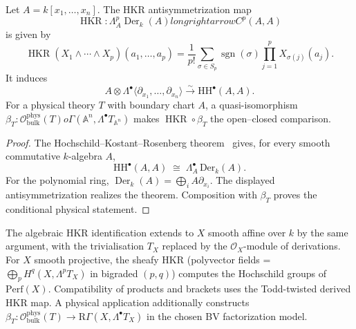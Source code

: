 \begin{proposition}
\label{prop:master-oca-bmodel}
Let $A=k[x_1,\ldots,x_n]$.  The HKR antisymmetrization map
\[
 \operatorname{HKR}\colon
 \Lambda_A^p\operatorname{Der}_k(A)longrightarrow C^p(A,A)
\]
is given by
\[
 \operatorname{HKR}(X_1\wedge\cdots\wedge X_p)
 (a_1,\ldots,a_p)
 =\frac1{p!}\sum_{\sigma\in S_p}\!\operatorname{sgn}(\sigma)
 \prod_{j=1}^pX_{\sigma(j)}(a_j).
\]
It induces
\[
 A\otimes\Lambda^\bullet
 \langle\partial_{x_1},\ldots,\partial_{x_n}\rangle
 \xrightarrow{\sim}\mathrm{HH}^\bullet(A,A).
\]
For a physical theory $T$ with boundary chart $A$, a quasi-isomorphism
$\beta_T\colon\mathcal O^{\mathrm{phys}}_{\mathrm{bulk}}(T)	o
\Gamma(\mathbb A^n,\Lambda^\bullet T_{\mathbb A^n})$ makes
$\operatorname{HKR}\circ\beta_T$ the open--closed comparison.
\end{proposition}

\begin{proof}
The Hochschild--Kostant--Rosenberg theorem~\cite{HKR62}
gives, for every smooth commutative $k$-algebra $A$,
\[
\mathrm{HH}^\bullet(A, A)
 \;\cong\; \Lambda^\bullet_A \, \mathrm{Der}_k(A).
\]
For the polynomial ring,
$\operatorname{Der}_k(A)=\bigoplus_iA\partial_{x_i}$.  The displayed
antisymmetrization realizes the theorem.  Composition with
$\beta_T$ proves the conditional physical statement.
\end{proof}

\begin{remark}
\label{rem:master-oca-bmodel-scope}
The algebraic HKR identification extends to $X$ smooth affine over $k$ by the
same argument, with the trivialisation $T_X$ replaced by the
$\mathcal O_X$-module of derivations. For $X$ smooth projective, the
sheafy HKR \textup{(}polyvector fields = $\bigoplus_p
H^q(X, \Lambda^p T_X)$ in bigraded $(p, q)$\textup{)} computes the
Hochschild groups of $\mathrm{Perf}(X)$.  Compatibility of products
and brackets uses the Todd-twisted derived HKR map.  A physical
application additionally constructs
$\beta_T\colon\mathcal O^{\mathrm{phys}}_{\mathrm{bulk}}(T)\to
\mathrm R\Gamma(X,\Lambda^\bullet T_X)$ in the chosen BV
factorization model.
\end{remark}

